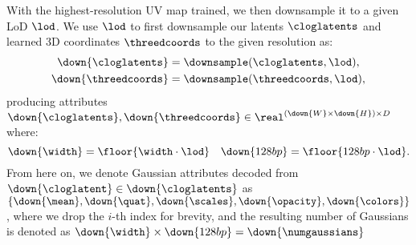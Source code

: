     With the highest-resolution UV map trained, we then downsample it to a
    given LoD $\lod$.
    We use $\lod$ to first downsample our latents $\cloglatents$ and learned 3D coordinates $\threedcoords$ to the given resolution as:
    \begin{equation}
      \begin{aligned}
        \down{\cloglatents}  & = \downsample(\cloglatents, \lod),  \\
        \down{\threedcoords} & = \downsample(\threedcoords, \lod),
      \end{aligned}
    \end{equation}
    producing attributes $\down{\cloglatents},\down{\threedcoords} \in \real^{(\down{W} \times \down{H}) \times D}$ where:
    \begin{equation}
      \down{\width} = \floor{\width \cdot \lod}\quad \down{\height} = \floor{\height \cdot \lod}.
    \end{equation}
    From here on, we denote Gaussian attributes decoded from
    $\down{\cloglatent} \in \down{\cloglatents}$ as
    $\{\down{\mean},\down{\quat},\down{\scales},\down{\opacity},\down{\colors}\}$,
    where we drop the $i$-th index for brevity, and the resulting number of
    Gaussians is denoted as $\down{\width} \times \down{\height} =
    \down{\numgaussians}$

